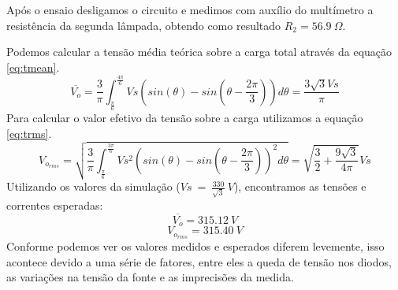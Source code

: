 \documentclass{report}
\begin{document}
Após o ensaio desligamos o circuito e medimos com auxílio do multímetro a resistência da segunda lâmpada, obtendo como resultado $R_2=56.9\ \Omega$.

Podemos calcular a tensão média teórica sobre a carga total através da equação \ref{eq:tmean}.
\begin{equation}
	\overline{V_o} = \frac{3}{\pi} \int_{\frac{\pi}{6}}^{\frac{4\pi}{6}}{Vs(sin(\theta) - sin(\theta - \frac{2\pi}{3}))d\theta} = \frac{3\sqrt{3}Vs}{\pi}
	\label{eq:tmean}
\end{equation}
Para calcular o valor efetivo da tensão sobre a carga utilizamos a equação \ref{eq:trms}.
\begin{equation}
	V_{o_{rms}} = \sqrt{\frac{3}{\pi} \int_{\frac{\pi}{6}}^{\frac{3\pi}{6}}{Vs^2(sin(\theta) - sin(\theta - \frac{2\pi}{3}))^2 d\theta}} = \sqrt{\frac{3}{2} + \frac{9\sqrt{3}}{4\pi}}Vs
	\label{eq:trms}
\end{equation}
Utilizando os valores da simulação ($Vs\ =\ \frac{330}{\sqrt{3}}\ V$), encontramos as tensões e correntes esperadas:
\begin{equation}
	\overline{V_o} = 315.12\ V
\end{equation}
\begin{equation}
	V_{o_{rms}} =  315.40\ V
\end{equation}
Conforme podemos ver os valores medidos e esperados diferem levemente, isso acontece devido a uma série de fatores, entre eles a queda de tensão nos diodos, as variações na tensão da fonte e as imprecisões da medida.



\end{document}
